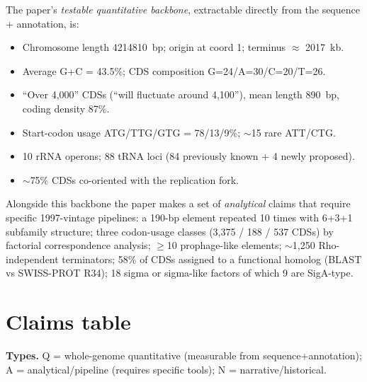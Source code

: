 \documentclass[11pt,letterpaper]{article}
\begin{document}
The paper's \emph{testable quantitative backbone}, extractable directly from the sequence + annotation, is:
\begin{itemize}[nosep,leftmargin=1.5em]
\item Chromosome length \SI{4214810}{bp}; origin at coord 1; terminus $\approx$ \SI{2017}{kb}.
\item Average G+C = 43.5\%; CDS composition G=24/A=30/C=20/T=26.
\item ``Over 4,000'' CDSs (``will fluctuate around 4,100''), mean length \SI{890}{bp}, coding density 87\%.
\item Start-codon usage ATG/TTG/GTG = 78/13/9\%; $\sim$15 rare ATT/CTG.
\item 10 rRNA operons; 88 tRNA loci (84 previously known + 4 newly proposed).
\item $\sim$75\% CDSs co-oriented with the replication fork.
\end{itemize}

Alongside this backbone the paper makes a set of \emph{analytical} claims that require specific 1997-vintage pipelines: a 190-bp element repeated 10 times with 6+3+1 subfamily structure; three codon-usage classes (3,375 / 188 / 537 CDSs) by factorial correspondence analysis; $\geq$10 prophage-like elements; $\sim$1,250 Rho-independent terminators; 58\% of CDSs assigned to a functional homolog (BLAST vs SWISS-PROT R34); 18 sigma or sigma-like factors of which 9 are SigA-type.

\section{Claims table}
\label{sec:claims}

\textbf{Types.} Q = whole-genome quantitative (measurable from sequence+annotation); A = analytical/pipeline (requires specific tools); N = narrative/historical.
\end{document}
